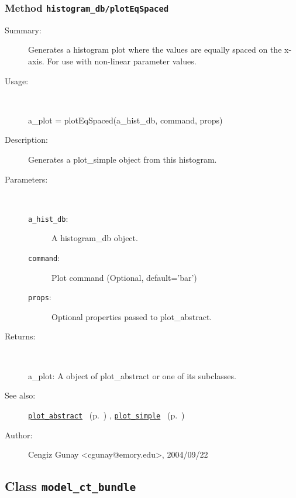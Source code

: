 \subsubsection[Method \texttt{plotEqSpaced}]{Method \texttt{histogram\_db/plotEqSpaced}}%
%
\label{ref_histogram_db__plotEqSpaced}%
\hypertarget{ref_histogram_db__plotEqSpaced}{}%
\begin{description}
\item[Summary:]Generates a histogram plot where the values are equally spaced on the x-axis. For use with non-linear parameter values.
%
\item[Usage:]~%
\begin{lyxcode}%
a\_plot = plotEqSpaced(a\_hist\_db, command, props)
%
\end{lyxcode}%
%
\item[Description:]%
Generates a plot\_simple object from this histogram.
\item[Parameters:]~
\begin{description}%
\item[\texttt{a\_hist\_db}:]
 A histogram\_db object.
\item[\texttt{command}:]
 Plot command (Optional, default='bar')
\item[\texttt{props}:]
 Optional properties passed to plot\_abstract.
\end{description}%
%
\item[Returns:]~

	a\_plot: A object of plot\_abstract or one of its subclasses.
%
%
\item[See also:]%
\hyperlink{ref_plot_abstract}{\texttt{plot\_abstract}}%
\ (p.~\pageref{ref_plot_abstract})%
%
, \hyperlink{ref_plot_simple}{\texttt{plot\_simple}}%
\ (p.~\pageref{ref_plot_simple})%
%
%
\item[Author:]%
Cengiz Gunay <cgunay@emory.edu>, 2004/09/22%
\end{description}
\methodline%
\subsection{Class \texttt{model\_ct\_bundle}}%
%
\label{ref_model_ct_bundle}%
\hypertarget{ref_model_ct_bundle}{}%
